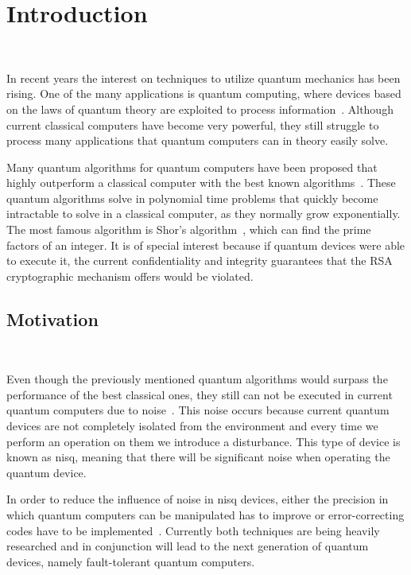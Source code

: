 \chapter{Introduction}\label{chapter:introduction} \

In recent years the interest on techniques to utilize quantum mechanics has been rising.
One of the many applications is quantum computing, where devices based on the laws
of quantum theory are exploited to process information~\cite{national_academies_of_sciences_engineering_and_medicine_quantum_2019}.
Although current classical computers have become very powerful, they still struggle to
process many applications that quantum computers can in theory easily solve. \

Many quantum algorithms for quantum computers have been proposed that highly
outperform a classical computer with the best known algorithms~\cite{shor_polynomial-time_1997, van_dam_quantum_2006, hallgren_polynomial-time_2007}.
These quantum algorithms solve in polynomial time problems that quickly become
intractable to solve in a classical computer, as they normally grow exponentially.
The most famous algorithm is Shor's algorithm~\cite{shor_polynomial-time_1997}, which can find the prime factors
of an integer. It is of special interest because if quantum devices
were able to execute it, the current confidentiality and integrity guarantees
that the RSA~\cite{rivest_method_1978} cryptographic mechanism offers would be violated. \

\section{Motivation} \

Even though the previously mentioned quantum algorithms would surpass the performance
of the best classical ones, they still can not be executed in current quantum
computers due to noise~\cite{preskill_quantum_2018}. This noise occurs because
current quantum devices are not completely isolated from the environment and every
time we perform an operation on them we introduce a disturbance. This type of device
is known as \ac{nisq}, meaning that there will be significant noise when operating
the quantum device. \

In order to reduce the influence of noise in \ac{nisq} devices, either the precision
in which quantum computers can be manipulated has to improve or error-correcting
codes have to be implemented~\cite{shor_quantum_nodate}. Currently both techniques are
being heavily researched and in conjunction will lead to the next generation of
quantum devices, namely fault-tolerant quantum computers. \

